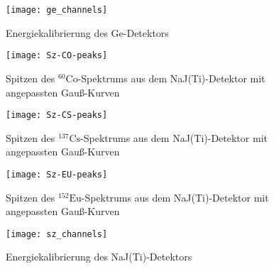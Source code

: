 \documentclass[11pt, ngerman, fleqn, DIV=15, headinclude, BCOR=2cm]{scrreprt}
\newcommand{\plotwidth}{0.8\linewidth}
\begin{document}



\begin{figure}
    \centering
    \texttt{[image: ge\_channels]}
    \caption{%
	    Energiekalibrierung des Ge-Detektors
    }
    \label{fig:ge_kanal}
\end{figure}



\begin{figure}
    \centering
    \texttt{[image: Sz-CO-peaks]}
    \caption{%
	    Spitzen des $^{60}\text{Co}$-Spektrums aus dem NaJ(Ti)-Detektor
	    mit angepassten Gauß-Kurven
    }
    \label{fig:}
\end{figure}

\begin{figure}
    \centering
    \texttt{[image: Sz-CS-peaks]}
    \caption{%
	    Spitzen des $^{137}\text{Cs}$-Spektrums aus dem NaJ(Ti)-Detektor
	    mit angepassten Gauß-Kurven
    }
    \label{fig:}
\end{figure}

\begin{figure}
    \centering
    \texttt{[image: Sz-EU-peaks]}
    \caption{%
	    Spitzen des $^{152}\text{Eu}$-Spektrums aus dem NaJ(Ti)-Detektor
	    mit angepassten Gauß-Kurven
    }
    \label{fig:}
\end{figure}

\begin{figure}
    \centering
    \texttt{[image: sz\_channels]}
    \caption{%
	    Energiekalibrierung des NaJ(Ti)-Detektors
    }
    \label{fig:sz_kanal}
\end{figure}
\end{document}
